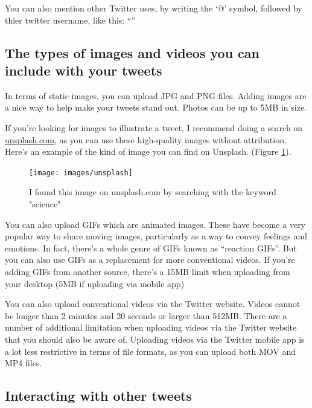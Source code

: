 \documentclass[]{book}
\begin{document}
You can also mention other Twitter uses, by writing the `@' symbol, followed by thier twitter username, like this: ``\citet{dsquintana}''

\hypertarget{the-types-of-images-and-videos-you-can-include-with-your-tweets}{%
\subsection{The types of images and videos you can include with your tweets}\label{the-types-of-images-and-videos-you-can-include-with-your-tweets}}

In terms of static images, you can upload JPG and PNG files. Adding images are a nice way to help make your tweets stand out. Photos can be up to 5MB in size.

If you're looking for images to illustrate a tweet, I recommend doing a search on \href{https://unsplash.com/}{unsplash.com}, as you can use these high-quality images without attribution. Here's an example of the kind of image you can find on Unsplash. (Figure \ref{fig:unsplash}).

\begin{figure}

{\centering \texttt{[image: images/unsplash]} 

}

\caption{I found this image on unsplash.com by searching with the keyword "science"}\label{fig:unsplash}
\end{figure}

You can also upload GIFs which are animated images. These have become a very popular way to share moving images, particularly as a way to convey feelings and emotions. In fact, there's a whole genre of GIFs known as ``reaction GIFs''. But you can also use GIFs as a replacement for more conventional videos. If you're adding GIFs from another source, there's a 15MB limit when uploading from your desktop (5MB if uploading via mobile app)

You can also upload conventional videos via the Twitter website. Videos cannot be longer than 2 minutes and 20 seconds or larger than 512MB. There are a number of additional limitation when uploading videos via the Twitter website that you should also be aware of. Uploading videos via the Twitter mobile app is a lot less restrictive in terms of file formats, as you can upload both MOV and MP4 files.

\hypertarget{interacting-with-other-tweets}{%
\subsection{Interacting with other tweets}\label{interacting-with-other-tweets}}
\end{document}
